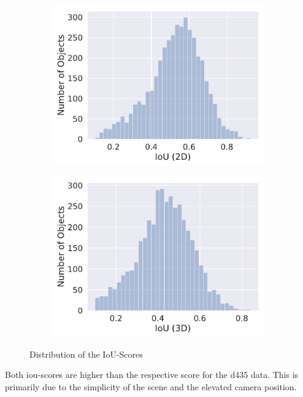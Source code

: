 \begin{figure}[h!]
    \centering
    \begin{subfigure}[c]{0.48\textwidth}
        \includegraphics[width=\textwidth]{../Material/iou2_lehr.pdf}
    \end{subfigure}
    \begin{subfigure}[c]{0.48\textwidth}
        \includegraphics[width=\textwidth]{../Material/iou3_lehr.pdf}
    \end{subfigure}
    \caption{Distribution of the IoU-Scores}
    \label{fig:eval:iouDistLehr}
\end{figure}

Both \ac{iou}-scores are higher than the respective score for the \ac{d435} data. This is primarily due to the simplicity of the scene and the elevated camera position.

